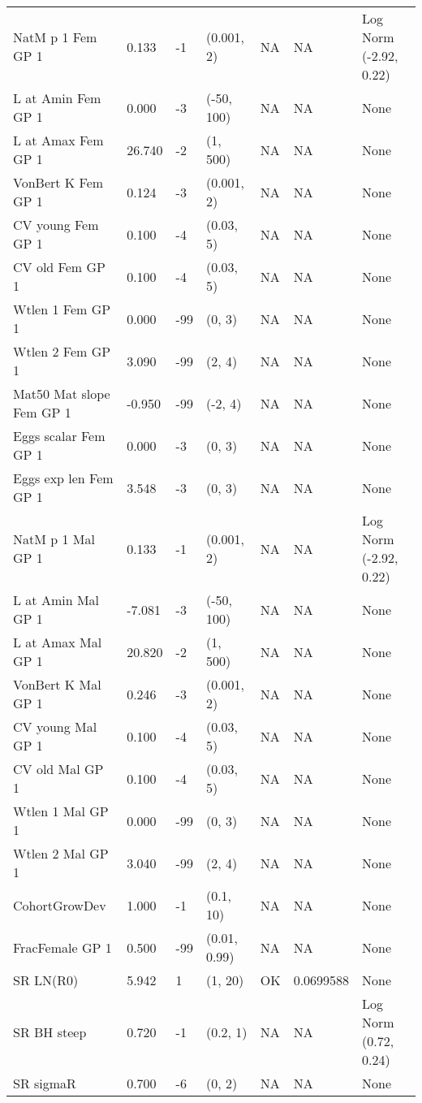 \documentclass[11pt,
  english,
  a4paper,
]{article}
\begin{document}
\begin{landscape}
\begin{longtable}[t]{>{\raggedright\arraybackslash}p{6cm}lllll>{\raggedright\arraybackslash}p{4cm}}
\endfoot
\bottomrule
\endlastfoot
NatM p 1 Fem GP 1 & 0.133 & -1 & (0.001, 2) & NA & NA & Log Norm (-2.92, 0.22)\\
L at Amin Fem GP 1 & 0.000 & -3 & (-50, 100) & NA & NA & None\\
L at Amax Fem GP 1 & 26.740 & -2 & (1, 500) & NA & NA & None\\
VonBert K Fem GP 1 & 0.124 & -3 & (0.001, 2) & NA & NA & None\\
CV young Fem GP 1 & 0.100 & -4 & (0.03, 5) & NA & NA & None\\
CV old Fem GP 1 & 0.100 & -4 & (0.03, 5) & NA & NA & None\\
Wtlen 1 Fem GP 1 & 0.000 & -99 & (0, 3) & NA & NA & None\\
Wtlen 2 Fem GP 1 & 3.090 & -99 & (2, 4) & NA & NA & None\\
Mat50%
Mat slope Fem GP 1 & -0.950 & -99 & (-2, 4) & NA & NA & None\\
Eggs scalar Fem GP 1 & 0.000 & -3 & (0, 3) & NA & NA & None\\
Eggs exp len Fem GP 1 & 3.548 & -3 & (0, 3) & NA & NA & None\\
NatM p 1 Mal GP 1 & 0.133 & -1 & (0.001, 2) & NA & NA & Log Norm (-2.92, 0.22)\\
L at Amin Mal GP 1 & -7.081 & -3 & (-50, 100) & NA & NA & None\\
L at Amax Mal GP 1 & 20.820 & -2 & (1, 500) & NA & NA & None\\
VonBert K Mal GP 1 & 0.246 & -3 & (0.001, 2) & NA & NA & None\\
CV young Mal GP 1 & 0.100 & -4 & (0.03, 5) & NA & NA & None\\
CV old Mal GP 1 & 0.100 & -4 & (0.03, 5) & NA & NA & None\\
Wtlen 1 Mal GP 1 & 0.000 & -99 & (0, 3) & NA & NA & None\\
Wtlen 2 Mal GP 1 & 3.040 & -99 & (2, 4) & NA & NA & None\\
CohortGrowDev & 1.000 & -1 & (0.1, 10) & NA & NA & None\\
FracFemale GP 1 & 0.500 & -99 & (0.01, 0.99) & NA & NA & None\\
SR LN(R0) & 5.942 & 1 & (1, 20) & OK & 0.0699588 & None\\
SR BH steep & 0.720 & -1 & (0.2, 1) & NA & NA & Log Norm (0.72, 0.24)\\
SR sigmaR & 0.700 & -6 & (0, 2) & NA & NA & None\\

\end{longtable}
\end{landscape}
\end{document}
